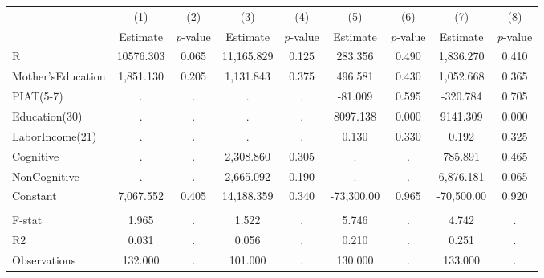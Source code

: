 \begin{tabular}{lcccccccc} \toprule
 & (1) & (2) & (3) & (4) & (5) & (6) & (7) & (8) \\ 
 & Estimate  & $p$-value  & Estimate  & $p$-value  & Estimate  & $p$-value  & Estimate  & $p$-value  \\  \midrule
R & 10576.303 &     0.065 & 11,165.829 &     0.125 &   283.356 &     0.490 &  1,836.270 &     0.410 \\  
Mother'sEducation &  1,851.130 &     0.205 &  1,131.843 &     0.375 &   496.581 &     0.430 &  1,052.668 &     0.365 \\  
PIAT(5-7) &         . &         . &         . &         . &   -81.009 &     0.595 &  -320.784 &     0.705 \\  
Education(30) &         . &         . &         . &         . &  8097.138 &     0.000 &  9141.309 &     0.000 \\  
LaborIncome(21) &         . &         . &         . &         . &     0.130 &     0.330 &     0.192 &     0.325 \\  
Cognitive &         . &         . &  2,308.860 &     0.305 &         . &         . &   785.891 &     0.465 \\  
NonCognitive &         . &         . &  2,665.092 &     0.190 &         . &         . &  6,876.181 &     0.065 \\  
Constant &  7,067.552 &     0.405 & 14,188.359 &     0.340 & -73,300.00 &     0.965 & -70,500.00 &     0.920 \\ \\  \midrule
F-stat &     1.965 &         . &     1.522 &         . &     5.746 &         . &     4.742 &         . \\  
R2 &     0.031 &         . &     0.056 &         . &     0.210 &         . &     0.251 &         . \\  
Observations &   132.000 &         . &   101.000 &         . &   130.000 &         . &   133.000 &         . \\  
\bottomrule  \end{tabular}
